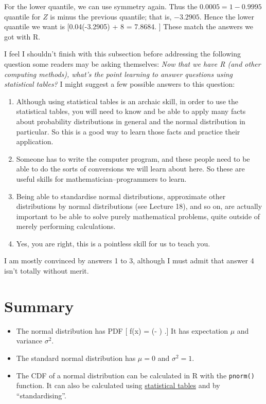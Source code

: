 \documentclass[
  letterpaper,
]{report}
\providecommand{\tightlist}{%
  \setlength{\itemsep}{0pt}\setlength{\parskip}{0pt}}\usepackage{longtable,booktabs,array}
\theoremstyle{definition}
\theoremstyle{definition}
\theoremstyle{remark}
\begin{document}
For the lower quantile, we can use symmetry again. Thus the
\(0.0005 = 1 - 0.9995\) quantile for \(Z\) is minus the previous
quantile; that is, \(-3.2905\). Hence the lower quantile we want is
{[}0.04\times (-3.2905) + 8 = 7.8684. {]} These match the answers we got
with R.

I feel I shouldn't finish with this subsection before addressing the
following question some readers may be asking themselves: \emph{Now that
we have R (and other computing methods), what's the point learning to
answer questions using statistical tables?} I might suggest a few
possible answers to this question:

\begin{enumerate}
\def\labelenumi{\arabic{enumi}.}
\tightlist
\item
  Although using statistical tables is an archaic skill, in order to use
  the statistical tables, you will need to know and be able to apply
  many facts about probability distributions in general and the normal
  distribution in particular. So this is a good way to learn those facts
  and practice their application.
\item
  Someone has to write the computer program, and these people need to be
  able to do the sorts of conversions we will learn about here. So these
  are useful skills for mathematician--programmers to learn.
\item
  Being able to standardise normal distributions, approximate other
  distributions by normal distributions (see Lecture 18), and so on, are
  actually important to be able to solve purely mathematical problems,
  quite outside of merely performing calculations.
\item
  Yes, you are right, this is a pointless skill for us to teach you.
\end{enumerate}

I am mostly convinced by answers 1 to 3, although I must admit that
answer 4 isn't totally without merit.

\hypertarget{summary-L16}{%
\section*{Summary}\label{summary-L16}}


\begin{itemize}
\tightlist
\item
  The normal distribution has PDF {[} f(x) =
   \exp \left(-
   \right) .{]} It has expectation \(\mu\)
  and variance \(\sigma^2\).
\item
  The standard normal distribution has \(\mu = 0\) and \(\sigma^2 = 1\).
\item
  The CDF of a normal distribution can be calculated in R with the
  \texttt{pnorm()} function. It can also be calculated using
  \href{https://mpaldridge.github.io/math1710/stat-tab.pdf}{statistical
  tables} and by ``standardising''.
\end{itemize}
\end{document}
